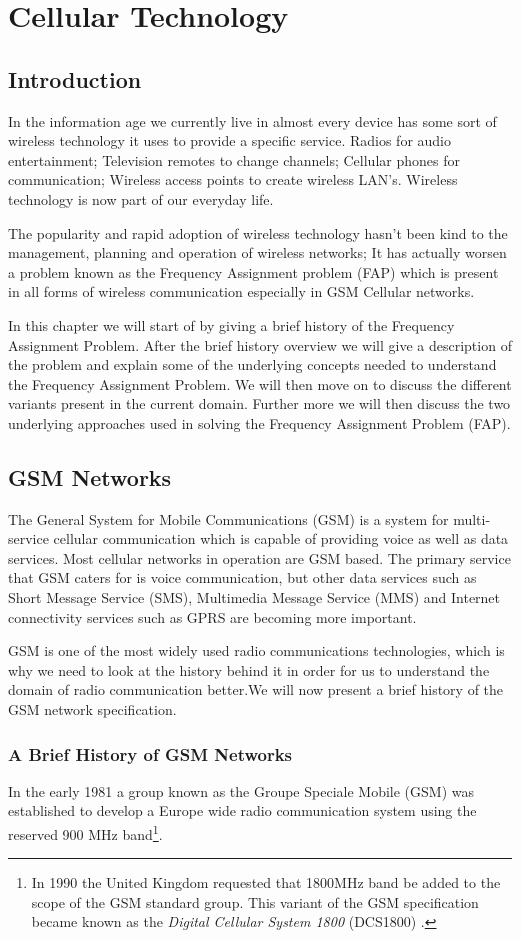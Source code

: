 \chapter{Cellular Technology}
\label{chpt:celltech}
\section{Introduction}
In the information age we currently live in almost every device has some sort of wireless technology it uses to provide a specific service. Radios for audio entertainment; Television remotes to change 
channels; Cellular phones for communication; Wireless access points to create wireless LAN's\cite{Karen2004}. Wireless technology is now part of our everyday life.

The popularity and rapid adoption of wireless technology hasn't been kind to the management, planning and operation of wireless networks; It has actually worsen a problem known as the Frequency Assignment problem (FAP) which is present in all forms of wireless communication especially in GSM Cellular networks.

In this chapter we will start of by giving a brief history of the Frequency Assignment Problem. After the brief history overview we will give a description of the problem and explain some of the
underlying concepts needed to understand the Frequency Assignment Problem. We will then move on to discuss the different variants present in the current domain. Further more we will
then discuss the two underlying approaches used in solving the Frequency Assignment Problem (FAP).
\section{GSM Networks}
The General System for Mobile Communications (GSM) is a system for multi-service cellular communication which is capable of providing voice as well as data services. Most cellular networks in operation 
are GSM based. The primary service that GSM caters for is voice communication, but other data services such as Short Message Service (SMS), Multimedia Message Service (MMS) and Internet 
connectivity services such as GPRS are becoming more important\cite{Eisenblatter}.

GSM is one of the most widely used radio communications technologies, which is why we need to look at the history behind it in order for us to understand the domain of radio communication better.We will now present a brief history of the GSM network specification.
\subsection{A Brief History of GSM Networks}
In the early 1981 a group known as the Groupe Speciale Mobile (GSM) was established to develop a Europe wide radio communication system using the reserved 900 MHz band\footnote{In 1990 the United Kingdom requested that 1800MHz band be added to the scope of the GSM standard group. This variant of the GSM specification became known as the \emph{Digital Cellular System 1800} (DCS1800) \cite{GSM92}.}.

